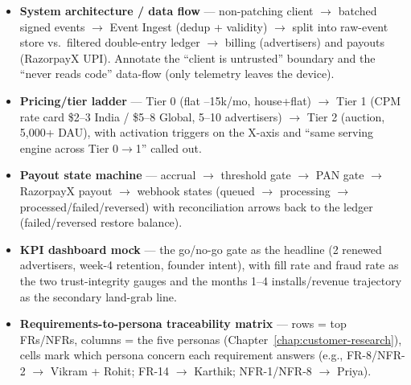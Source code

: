 \begin{itemize}
\item \textbf{System architecture / data flow} --- non-patching client $\to$ batched signed events $\to$ Event Ingest (dedup + validity) $\to$ split into raw-event store vs.\ filtered double-entry ledger $\to$ billing (advertisers) and payouts (RazorpayX UPI). Annotate the ``client is untrusted'' boundary and the ``never reads code'' data-flow (only telemetry leaves the device).
\item \textbf{Pricing/tier ladder} --- Tier 0 (flat --15k/mo, house+flat) $\to$ Tier 1 (CPM rate card \$2--3 India / \$5--8 Global, 5--10 advertisers) $\to$ Tier 2 (auction, 5{,}000+ DAU), with activation triggers on the X-axis and ``same serving engine across Tier 0$\to$1'' called out.
\item \textbf{Payout state machine} --- accrual $\to$  threshold gate $\to$ PAN gate $\to$ RazorpayX payout $\to$ webhook states (queued $\to$ processing $\to$ processed/failed/reversed) with reconciliation arrows back to the ledger (failed/reversed restore balance).
\item \textbf{KPI dashboard mock} --- the go/no-go gate as the headline (2 renewed advertisers, week-4 retention, founder intent), with fill rate and fraud rate as the two trust-integrity gauges and the months 1--4 installs/revenue trajectory as the secondary land-grab line.
\item \textbf{Requirements-to-persona traceability matrix} --- rows = top FRs/NFRs, columns = the five personas (Chapter~\ref{chap:customer-research}), cells mark which persona concern each requirement answers (e.g., FR-8/NFR-2 $\to$ Vikram + Rohit; FR-14 $\to$ Karthik; NFR-1/NFR-8 $\to$ Priya).
\end{itemize}
